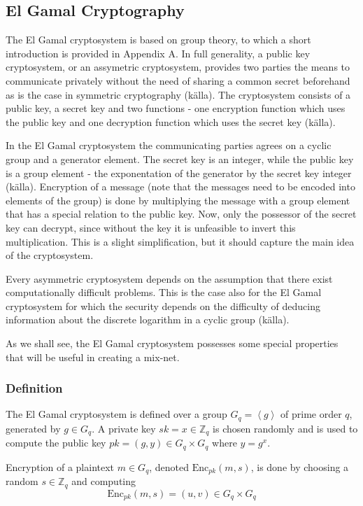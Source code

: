 \subsection{El Gamal Cryptography}

The El Gamal cryptosystem is based on group theory, to which a short
introduction is provided in Appendix A. In full generality, a public
key cryptosystem, or an assymetric cryptosystem, provides two parties
the means to communicate privately without the need of sharing a
common secret beforehand as is the case in symmetric cryptography
(källa). The cryptosystem consists of a public key, a secret key and
two functions - one encryption function which uses the public key and
one decryption function which uses the secret key (källa).

In the El Gamal cryptosystem the communicating parties agrees on a
cyclic group and a generator element. The secret key is an integer,
while the public key is a group element - the exponentation of the
generator by the secret key integer (källa). Encryption of a message
(note that the messages need to be encoded into elements of the group)
is done by multiplying the message with a group element that has a
special relation to the public key. Now, only the possessor of the
secret key can decrypt, since without the key it is unfeasible to
invert this multiplication. This is a slight simplification, but it
should capture the main idea of the cryptosystem.

Every asymmetric cryptosystem depends on the assumption that there
exist computationally difficult problems. This is the case also for
the El Gamal cryptosystem for which the security depends on the
difficulty of deducing information about the discrete logarithm in a
cyclic group (källa).

As we shall see, the El Gamal cryptosystem possesses some special
properties that will be useful in creating a mix-net.

\subsubsection{Definition}
The El Gamal cryptosystem is defined over a group $G_q =
\left<g\right>$ of prime order $q$, generated by $g \in G_q$. A
private key $sk = x \in \mathbb{Z}_q$ is chosen randomly and is used
to compute the public key $pk = (g,y) \in G_q \times G_q$ where $y =
g^x$.

Encryption of a plaintext $m \in G_q$, denoted
$\mathrm{Enc}_{pk}(m,s)$, is done by choosing a random $s \in
\mathbb{Z}_q$ and computing
$$
\mathrm{Enc}_{pk}(m,s) = (u,v) \in G_q \times G_q
$$

